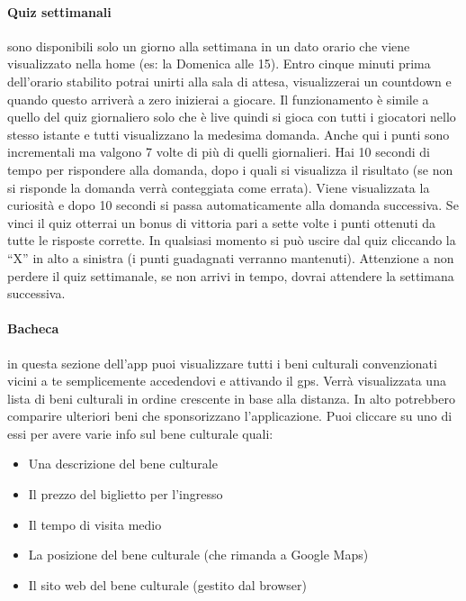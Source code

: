 \documentclass{article}
\begin{document}
\paragraph{Quiz settimanali} sono disponibili solo un giorno alla settimana in un dato orario che viene visualizzato nella home (es: la Domenica alle 15). Entro cinque minuti prima dell’orario stabilito potrai unirti alla sala di attesa, visualizzerai un countdown e quando questo arriverà a zero inizierai a giocare. Il funzionamento è simile a quello del quiz giornaliero solo che è live quindi si gioca con tutti i giocatori nello stesso istante e tutti visualizzano la medesima domanda. Anche qui i punti sono incrementali ma valgono 7 volte di più di quelli giornalieri. Hai 10 secondi di tempo per rispondere alla domanda, dopo i quali si visualizza il risultato (se non si risponde la domanda verrà conteggiata come errata). Viene visualizzata la curiosità e dopo 10 secondi si passa automaticamente alla domanda successiva. Se vinci il quiz otterrai un bonus di vittoria pari a sette volte i punti ottenuti da tutte le risposte corrette. In qualsiasi momento si può uscire dal quiz cliccando la “X” in alto a sinistra (i punti guadagnati verranno mantenuti). Attenzione a non perdere il quiz settimanale, se non arrivi in tempo, dovrai attendere la settimana successiva.

\paragraph{Bacheca} in questa sezione dell’app puoi visualizzare tutti i beni culturali convenzionati vicini a te semplicemente accedendovi e attivando il gps. Verrà visualizzata una lista di beni culturali in ordine crescente in base alla distanza. In alto potrebbero comparire ulteriori beni che sponsorizzano l’applicazione. Puoi cliccare su uno di essi per avere varie info sul bene culturale quali:
\begin{itemize}
\item Una descrizione del bene culturale
\item Il prezzo del biglietto per l’ingresso
\item Il tempo di visita medio
\item La posizione del bene culturale (che rimanda a Google Maps)
\item Il sito web del bene culturale (gestito dal browser)
\end{itemize}
\end{document}
